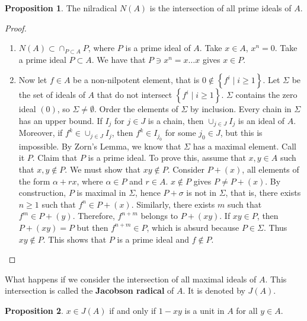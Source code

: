 \documentclass{article}
\newcommand{\rb}[1]{\left( #1 \right)}
\newcommand{\cb}[1]{\left\{ #1 \right\}}
\theoremstyle{definition}\newtheorem{definition}{Definition}[section]
\theoremstyle{definition}\newtheorem{remark}[definition]{Remark}
\theoremstyle{definition}\newtheorem*{example}{Example}
\theoremstyle{definition}\newtheorem*{note}{Note}
\newtheorem{proposition}[definition]{Proposition}
\begin{document}
\begin{proposition}
The nilradical $ N\rb{A} $ is the intersection of all prime ideals of $ A $.
\end{proposition}

\begin{proof}
\hfill
\begin{enumerate}
\item $ N\rb{A} \subset \cap_{P \subset A} P $, where $ P $ is a prime ideal of $ A $. Take $ x \in A $, $ x^n = 0 $. Take a prime ideal $ P \subset A $. We have that $ P \ni x^n = x \dots x $ gives $ x \in P $.
\item Now let $ f \in A $ be a non-nilpotent element, that is $ 0 \notin \cb{f^i \mid i \ge 1} $. Let $ \Sigma $ be the set of ideals of $ A $ that do not intersect $ \cb{f^i \mid i \ge 1} $. $ \Sigma $ contains the zero ideal $ \rb{0} $, so $ \Sigma \ne \emptyset $. Order the elements of $ \Sigma $ by inclusion. Every chain in $ \Sigma $ has an upper bound. If $ I_j $ for $ j \in J $ is a chain, then $ \cup_{j \in J} I_j $ is an ideal of $ A $. Moreover, if $ f^k \in \cup_{j \in J} I_j $, then $ f^k \in I_{j_0} $ for some $ j_0 \in J $, but this is impossible. By Zorn's Lemma, we know that $ \Sigma $ has a maximal element. Call it $ P $. Claim that $ P $ is a prime ideal. To prove this, assume that $ x, y \in A $ such that $ x, y \notin P $. We must show that $ xy \notin P $. Consider $ P + \rb{x} $, all elements of the form $ \alpha + rx $, where $ \alpha \in P $ and $ r \in A $. $ x \notin P $ gives $ P \ne P + \rb{x} $. By construction, $ P $ is maximal in $ \Sigma $, hence $ P + \sigma $ is not in $ \Sigma $, that is, there exists $ n \ge 1 $ such that $ f^n \in P + \rb{x} $. Similarly, there exists $ m $ such that $ f^m \in P + \rb{y} $. Therefore, $ f^{n + m} $ belongs to $ P + \rb{xy} $. If $ xy \in P $, then $ P + \rb{xy} = P $ but then $ f^{n + m} \in P $, which is absurd because $ P \in \Sigma $. Thus $ xy \notin P $. This shows that $ P $ is a prime ideal and $ f \notin P $.
\end{enumerate}
\end{proof}

What happens if we consider the intersection of all maximal ideals of $ A $. This intersection is called the \textbf{Jacobson radical} of $ A $. It is denoted by $ J\rb{A} $.

\begin{proposition}
\label{prop:5.3}
$ x \in J\rb{A} $ if and only if $ 1 - xy $ is a unit in $ A $ for all $ y \in A $.
\end{proposition}
\end{document}
